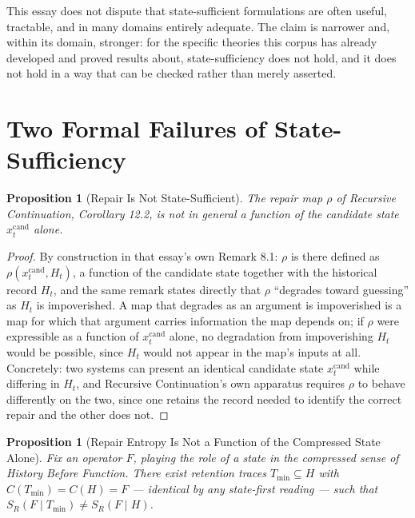 \documentclass[11pt]{article}
\newtheorem{proposition}[definition]{Proposition}
\begin{document}
This essay does not dispute that state-sufficient formulations are often useful, tractable, and in many domains entirely adequate. The claim is narrower and, within its domain, stronger: for the specific theories this corpus has already developed and proved results about, state-sufficiency does not hold, and it does not hold in a way that can be checked rather than merely asserted.

\section{Two Formal Failures of State-Sufficiency}

\begin{proposition}[Repair Is Not State-Sufficient]
\label{prop:repair}
The repair map $\rho$ of \emph{Recursive Continuation}, Corollary 12.2, is not in general a function of the candidate state $x_t^{\mathrm{cand}}$ alone.
\end{proposition}

\begin{proof}
By construction in that essay's own Remark 8.1: $\rho$ is there defined as $\rho(x_t^{\mathrm{cand}}, H_t)$, a function of the candidate state together with the historical record $H_t$, and the same remark states directly that $\rho$ ``degrades toward guessing'' as $H_t$ is impoverished. A map that degrades as an argument is impoverished is a map for which that argument carries information the map depends on; if $\rho$ were expressible as a function of $x_t^{\mathrm{cand}}$ alone, no degradation from impoverishing $H_t$ would be possible, since $H_t$ would not appear in the map's inputs at all. Concretely: two systems can present an identical candidate state $x_t^{\mathrm{cand}}$ while differing in $H_t$, and Recursive Continuation's own apparatus requires $\rho$ to behave differently on the two, since one retains the record needed to identify the correct repair and the other does not.
\end{proof}

\begin{proposition}[Repair Entropy Is Not a Function of the Compressed State Alone]
\label{prop:entropy}
Fix an operator $F$, playing the role of a state in the compressed sense of \emph{History Before Function}. There exist retention traces $T_{\min}\subseteq H$ with $C(T_{\min}) = C(H) = F$ — identical by any state-first reading — such that $S_R(F\mid T_{\min}) \neq S_R(F\mid H)$.
\end{proposition}
\end{document}
